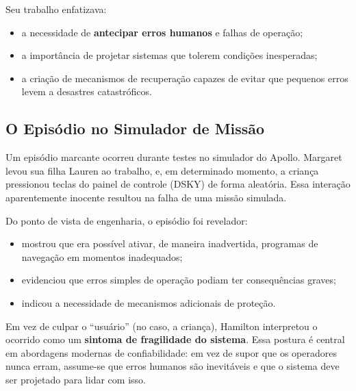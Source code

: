 \documentclass[12pt,a4paper,twoside]{report}
\begin{document}
Seu trabalho enfatizava:
\begin{itemize}[nosep]
    \item a necessidade de \textbf{antecipar erros humanos} e falhas de
    operação;
    \item a importância de projetar sistemas que tolerem condições inesperadas;
    \item a criação de mecanismos de recuperação capazes de evitar que
    pequenos erros levem a desastres catastróficos.
\end{itemize}

\subsection{O Episódio no Simulador de Missão}

Um episódio marcante ocorreu durante testes no simulador do Apollo. Margaret
levou sua filha Lauren ao trabalho, e, em determinado momento, a criança
pressionou teclas do painel de controle (DSKY) de forma aleatória. Essa
interação aparentemente inocente resultou na falha de uma missão simulada.

Do ponto de vista de engenharia, o episódio foi revelador:
\begin{itemize}[nosep]
    \item mostrou que era possível ativar, de maneira inadvertida, programas
    de navegação em momentos inadequados;
    \item evidenciou que erros simples de operação podiam ter consequências
    graves;
    \item indicou a necessidade de mecanismos adicionais de proteção.
\end{itemize}

Em vez de culpar o ``usuário'' (no caso, a criança), Hamilton interpretou o
ocorrido como um \textbf{sintoma de fragilidade do sistema}. Essa postura é
central em abordagens modernas de confiabilidade: em vez de supor que os
operadores nunca erram, assume-se que erros humanos são inevitáveis e que o
sistema deve ser projetado para lidar com isso.
\end{document}
